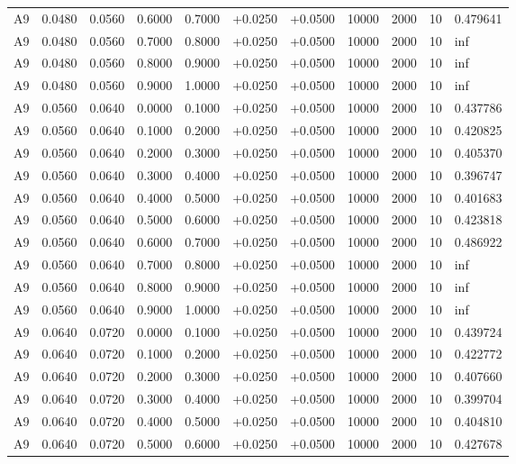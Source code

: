 \documentclass{article}
\begin{document}
\begin{longtable}{l r r r r r r r r r l}
A9 & 0.0480 & 0.0560 & 0.6000 & 0.7000 & +0.0250 & +0.0500 & 10000 & 2000 & 10 & 0.479641 \\
A9 & 0.0480 & 0.0560 & 0.7000 & 0.8000 & +0.0250 & +0.0500 & 10000 & 2000 & 10 & inf \\
A9 & 0.0480 & 0.0560 & 0.8000 & 0.9000 & +0.0250 & +0.0500 & 10000 & 2000 & 10 & inf \\
A9 & 0.0480 & 0.0560 & 0.9000 & 1.0000 & +0.0250 & +0.0500 & 10000 & 2000 & 10 & inf \\
A9 & 0.0560 & 0.0640 & 0.0000 & 0.1000 & +0.0250 & +0.0500 & 10000 & 2000 & 10 & 0.437786 \\
A9 & 0.0560 & 0.0640 & 0.1000 & 0.2000 & +0.0250 & +0.0500 & 10000 & 2000 & 10 & 0.420825 \\
A9 & 0.0560 & 0.0640 & 0.2000 & 0.3000 & +0.0250 & +0.0500 & 10000 & 2000 & 10 & 0.405370 \\
A9 & 0.0560 & 0.0640 & 0.3000 & 0.4000 & +0.0250 & +0.0500 & 10000 & 2000 & 10 & 0.396747 \\
A9 & 0.0560 & 0.0640 & 0.4000 & 0.5000 & +0.0250 & +0.0500 & 10000 & 2000 & 10 & 0.401683 \\
A9 & 0.0560 & 0.0640 & 0.5000 & 0.6000 & +0.0250 & +0.0500 & 10000 & 2000 & 10 & 0.423818 \\
A9 & 0.0560 & 0.0640 & 0.6000 & 0.7000 & +0.0250 & +0.0500 & 10000 & 2000 & 10 & 0.486922 \\
A9 & 0.0560 & 0.0640 & 0.7000 & 0.8000 & +0.0250 & +0.0500 & 10000 & 2000 & 10 & inf \\
A9 & 0.0560 & 0.0640 & 0.8000 & 0.9000 & +0.0250 & +0.0500 & 10000 & 2000 & 10 & inf \\
A9 & 0.0560 & 0.0640 & 0.9000 & 1.0000 & +0.0250 & +0.0500 & 10000 & 2000 & 10 & inf \\
A9 & 0.0640 & 0.0720 & 0.0000 & 0.1000 & +0.0250 & +0.0500 & 10000 & 2000 & 10 & 0.439724 \\
A9 & 0.0640 & 0.0720 & 0.1000 & 0.2000 & +0.0250 & +0.0500 & 10000 & 2000 & 10 & 0.422772 \\
A9 & 0.0640 & 0.0720 & 0.2000 & 0.3000 & +0.0250 & +0.0500 & 10000 & 2000 & 10 & 0.407660 \\
A9 & 0.0640 & 0.0720 & 0.3000 & 0.4000 & +0.0250 & +0.0500 & 10000 & 2000 & 10 & 0.399704 \\
A9 & 0.0640 & 0.0720 & 0.4000 & 0.5000 & +0.0250 & +0.0500 & 10000 & 2000 & 10 & 0.404810 \\
A9 & 0.0640 & 0.0720 & 0.5000 & 0.6000 & +0.0250 & +0.0500 & 10000 & 2000 & 10 & 0.427678 \\

\end{longtable}
\end{document}
